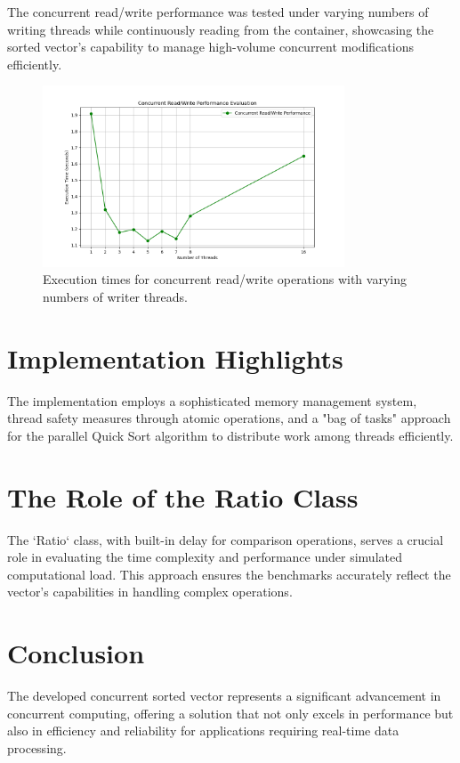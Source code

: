 \documentclass{article}
\begin{document}
The concurrent read/write performance was tested under varying numbers of writing threads while continuously reading from the container, showcasing the sorted vector's capability to manage high-volume concurrent modifications efficiently.

\begin{figure}[h]
\centering
\includegraphics[width=0.8\textwidth]{ConcurrentReadWritePerformanceEvaluation.png}
\caption{Execution times for concurrent read/write operations with varying numbers of writer threads.}
\label{fig:concurrentRW}
\end{figure}

\section{Implementation Highlights}

The implementation employs a sophisticated memory management system, thread safety measures through atomic operations, and a "bag of tasks" approach for the parallel Quick Sort algorithm to distribute work among threads efficiently.

\section{The Role of the Ratio Class}

The `Ratio` class, with built-in delay for comparison operations, serves a crucial role in evaluating the time complexity and performance under simulated computational load. This approach ensures the benchmarks accurately reflect the vector's capabilities in handling complex operations.

\section{Conclusion}

The developed concurrent sorted vector represents a significant advancement in concurrent computing, offering a solution that not only excels in performance but also in efficiency and reliability for applications requiring real-time data processing.
\end{document}
